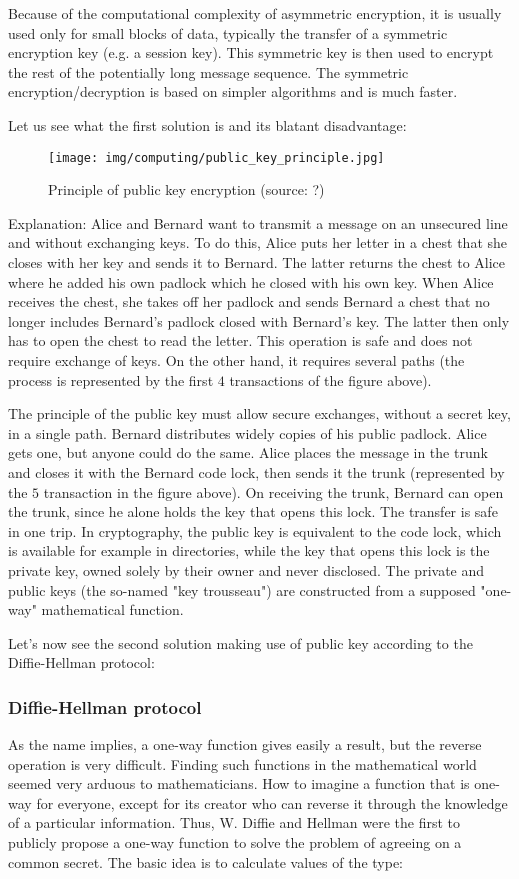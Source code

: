 	Because of the computational complexity of asymmetric encryption, it is usually used only for small blocks of data, typically the transfer of a symmetric encryption key (e.g. a session key). This symmetric key is then used to encrypt the rest of the potentially long message sequence. The symmetric encryption/decryption is based on simpler algorithms and is much faster.
	
	Let us see what the first solution is and its blatant disadvantage:
	\begin{figure}[H]
		\centering
		\texttt{[image: img/computing/public\_key\_principle.jpg]}
		\caption{Principle of public key encryption (source: ?)}
	\end{figure}
	Explanation: Alice and Bernard want to transmit a message on an unsecured line and without exchanging keys. To do this, Alice puts her letter in a chest that she closes with her key and sends it to Bernard. The latter returns the chest to Alice where he added his own padlock which he closed with his own key. When Alice receives the chest, she takes off her padlock and sends Bernard a chest that no longer includes Bernard's padlock closed with Bernard's key. The latter then only has to open the chest to read the letter. This operation is safe and does not require exchange of keys. On the other hand, it requires several paths (the process is represented by the first $4$ transactions of the figure above).
	
	The principle of the public key must allow secure exchanges, without a secret key, in a single path. Bernard distributes widely copies of his public padlock. Alice gets one, but anyone could do the same. Alice places the message in the trunk and closes it with the Bernard code lock, then sends it the trunk (represented by the $5$ transaction in the figure above). On receiving the trunk, Bernard can open the trunk, since he alone holds the key that opens this lock. The transfer is safe in one trip. In cryptography, the public key is equivalent to the code lock, which is available for example in directories, while the key that opens this lock is the private key, owned solely by their owner and never disclosed. The private and public keys (the so-named "key trousseau") are constructed from a supposed "one-way" mathematical function.

	Let's now see the second solution making use of public key according to the Diffie-Hellman protocol:
	
	\subsubsection{Diffie-Hellman protocol}
	As the name implies, a one-way function gives easily a result, but the reverse operation is very difficult. Finding such functions in the mathematical world seemed very arduous to mathematicians. How to imagine a function that is one-way for everyone, except for its creator who can reverse it through the knowledge of a particular information. Thus, W. Diffie and Hellman were the first to publicly propose a one-way function to solve the problem of agreeing on a common secret. The basic idea is to calculate values of the type:
	
